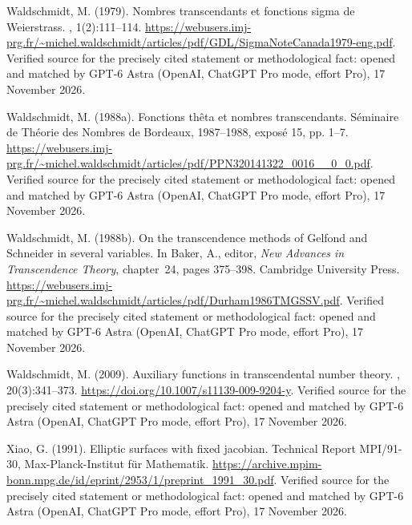 \begin{thebibliography}{}
Waldschmidt, M. (1979).
\newblock Nombres transcendants et fonctions sigma de {Weierstrass}.
, 1(2):111--114.
\newblock \url{https://webusers.imj-prg.fr/~michel.waldschmidt/articles/pdf/GDL/SigmaNoteCanada1979-eng.pdf}. Verified source for the precisely cited statement or methodological fact: opened and matched by GPT-6 Astra (OpenAI, ChatGPT Pro mode, effort Pro), 17 November 2026.

Waldschmidt, M. (1988a).
\newblock Fonctions th\^eta et nombres transcendants.
\newblock S\'eminaire de Th\'eorie des Nombres de Bordeaux, 1987--1988,
  expos\'e 15, pp. 1--7.
\newblock \url{https://webusers.imj-prg.fr/~michel.waldschmidt/articles/pdf/PPN320141322_0016__0_0.pdf}. Verified source for the precisely cited statement or methodological fact: opened and matched by GPT-6 Astra (OpenAI, ChatGPT Pro mode, effort Pro), 17 November 2026.

Waldschmidt, M. (1988b).
\newblock On the transcendence methods of {Gelfond} and {Schneider} in several
  variables.
\newblock In Baker, A., editor, {\em New Advances in Transcendence Theory},
  chapter~24, pages 375--398. Cambridge University Press.
\newblock \url{https://webusers.imj-prg.fr/~michel.waldschmidt/articles/pdf/Durham1986TMGSSV.pdf}. Verified source for the precisely cited statement or methodological fact: opened and matched by GPT-6 Astra (OpenAI, ChatGPT Pro mode, effort Pro), 17 November 2026.

Waldschmidt, M. (2009).
\newblock Auxiliary functions in transcendental number theory.
, 20(3):341--373.
\newblock \url{https://doi.org/10.1007/s11139-009-9204-y}. Verified source for the precisely cited statement or methodological fact: opened and matched by GPT-6 Astra (OpenAI, ChatGPT Pro mode, effort Pro), 17 November 2026.

Xiao, G. (1991).
\newblock Elliptic surfaces with fixed jacobian.
\newblock Technical Report MPI/91-30, Max-Planck-Institut f{\"u}r Mathematik.
\newblock \url{https://archive.mpim-bonn.mpg.de/id/eprint/2953/1/preprint_1991_30.pdf}. Verified source for the precisely cited statement or methodological fact: opened and matched by GPT-6 Astra (OpenAI, ChatGPT Pro mode, effort Pro), 17 November 2026.


\end{thebibliography}
